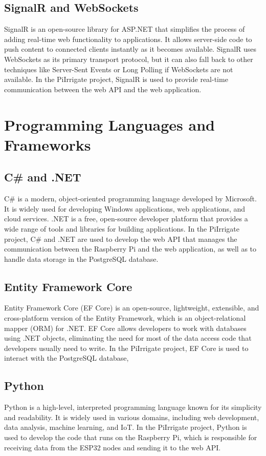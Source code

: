 \subsection{SignalR and WebSockets}
SignalR is an open-source library for ASP.NET that simplifies 
the process of adding real-time web functionality to applications.
It allows server-side code to push content to connected clients instantly as it becomes available.
SignalR uses WebSockets as its primary transport protocol, but it can also fall back to other techniques like
Server-Sent Events or Long Polling if WebSockets are not available.
In the PiIrrigate project, SignalR is used to provide real-time communication 
between the web API and the web application.

\section{Programming Languages and Frameworks}
\subsection{C\# and .NET}
C\# is a modern, object-oriented programming language developed by Microsoft.
It is widely used for developing Windows applications, web applications, and cloud services.
.NET is a free, open-source developer platform that provides a wide range of tools and libraries 
for building applications.
In the PiIrrigate project, C\# and .NET are used to develop the web API that manages the communication
between the Raspberry Pi and the web application, as well as to handle data storage in the PostgreSQL database.

\subsection{Entity Framework Core}
Entity Framework Core (EF Core) is an open-source, lightweight, extensible, and cross-platform version 
of the Entity Framework, which is an object-relational mapper (ORM) for .NET.
EF Core allows developers to work with databases using .NET objects, eliminating the need for 
most of the data access code that developers usually need to write.
In the PiIrrigate project, EF Core is used to interact with the PostgreSQL database,

\subsection{Python}
Python is a high-level, interpreted programming language known for its simplicity and readability.
It is widely used in various domains, including web development, data analysis, machine learning, and IoT.
In the PiIrrigate project, Python is used to develop the code that runs on the Raspberry Pi,
which is responsible for receiving data from the ESP32 nodes and sending it to the web API.

